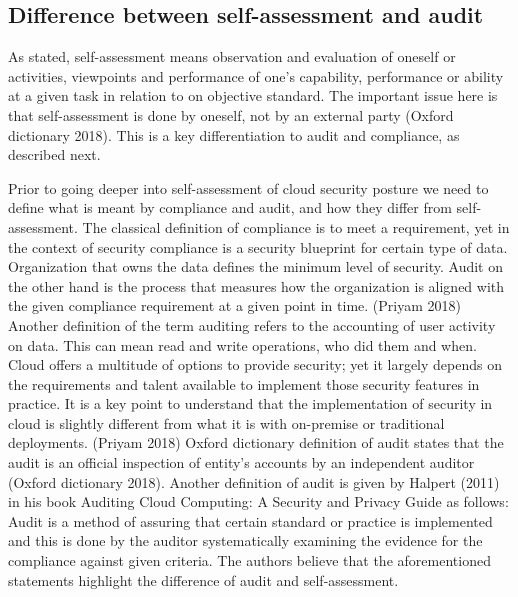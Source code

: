 \documentclass{article}
\begin{document}
\subsection{Difference between self-assessment and audit}
As stated, self-assessment means observation and evaluation of oneself or activities, viewpoints and performance of one's capability, performance or ability at a given task in relation to on objective standard. The important issue here is that self-assessment is done by oneself, not by an external party (Oxford dictionary 2018). This is a key differentiation to audit and compliance, as described next.
\par
Prior to going deeper into self-assessment of cloud security posture we need to define what is meant by compliance and audit, and how they differ from self-assessment.
The classical definition of compliance is to meet a requirement, yet in the context of security compliance is a security blueprint for certain type of data. Organization that owns the data defines the minimum level of security.
Audit on the other hand is the process that measures how the organization is aligned with the given compliance requirement at a given point in time. (Priyam 2018)
Another definition of the term auditing refers to the accounting of user activity on data. This can mean read and write operations, who did them and when.
Cloud offers a multitude of options to provide security; yet it largely depends on the requirements and talent available to implement those security features in practice. It is a key point to understand that the implementation of security in cloud is slightly different from what it is with on-premise or traditional deployments. (Priyam 2018)
Oxford dictionary definition of audit states that the audit is an official inspection of entity's accounts by an independent auditor (Oxford dictionary 2018). Another definition of audit is given by Halpert (2011) in his book Auditing Cloud Computing: A Security and Privacy Guide as follows: Audit is a method of assuring that certain standard or practice is implemented and this is done by the auditor systematically examining the evidence for the compliance against given criteria. The authors believe that the aforementioned statements highlight the difference of audit and self-assessment. 
\end{document}
